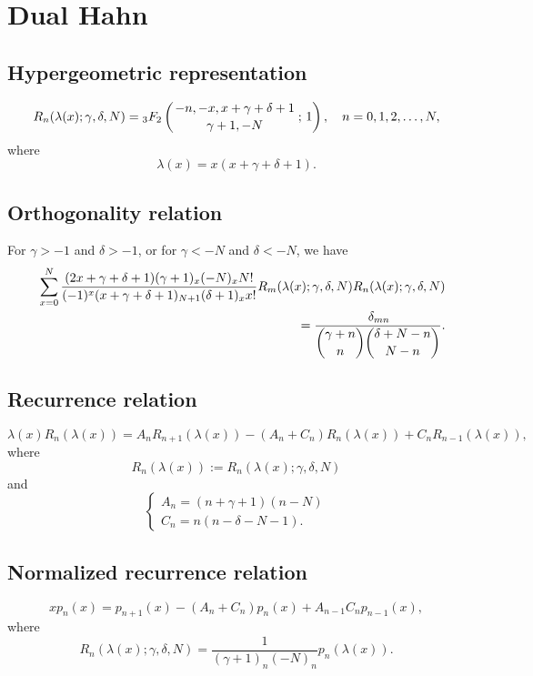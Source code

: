 \documentclass[envcountchap,graybox]{svmono}
\newcommand{\hyp}[5]{\mbox{}_{#1}{F}_{#2}
\left(\genfrac{}{}{0pt}{}{#3}{#4}\,;\,#5\right)}
\newcommand{\hyp}[5]{\,\mbox{}_{#1}F_{#2}\!\left(
  \genfrac{}{}{0pt}{}{#3}{#4};#5\right)}
\begin{document}
\section{Dual Hahn}

\par\setcounter{equation}{0}

\subsection*{Hypergeometric representation}
\begin{equation}
\label{DefDualHahn}
R_n(\lambda(x);\gamma,\delta,N)=
\hyp{3}{2}{-n,-x,x+\gamma+\delta+1}{\gamma+1,-N}{1},\quad n=0,1,2,\ldots,N,
\end{equation}
where
$$\lambda(x)=x(x+\gamma+\delta+1).$$

\subsection*{Orthogonality relation}
For $\gamma>-1$ and $\delta>-1$, or for $\gamma<-N$ and $\delta<-N$, we have
\begin{eqnarray}
\label{OrtDualHahn}
& &\sum_{x=0}^N\frac{(2x+\gamma+\delta+1)(\gamma+1)_x(-N)_xN!}{(-1)^x(x+\gamma+\delta+1)_{N+1}(\delta+1)_xx!}
R_m(\lambda(x);\gamma,\delta,N)R_n(\lambda(x);\gamma,\delta,N)\nonumber\\
& &{}=\frac{\,\delta_{mn}}{\dbinom{\gamma+n}{n}\dbinom{\delta+N-n}{N-n}}.
\end{eqnarray}

\subsection*{Recurrence relation}
\begin{equation}
\label{RecDualHahn}
\lambda(x)R_n(\lambda(x))
=A_nR_{n+1}(\lambda(x))-\left(A_n+C_n\right)R_n(\lambda(x))+C_nR_{n-1}(\lambda(x)),
\end{equation}
where
$$R_n(\lambda(x)):=R_n(\lambda(x);\gamma,\delta,N)$$
and
$$\left\{\begin{array}{l}
\displaystyle A_n=(n+\gamma+1)(n-N)\\[5mm]
\displaystyle C_n=n(n-\delta-N-1).
\end{array}\right.$$

\subsection*{Normalized recurrence relation}
\begin{equation}
\label{NormRecDualHahn}
xp_n(x)=p_{n+1}(x)-(A_n+C_n)p_n(x)+A_{n-1}C_np_{n-1}(x),
\end{equation}
where
$$R_n(\lambda(x);\gamma,\delta,N)=\frac{1}{(\gamma+1)_n(-N)_n}p_n(\lambda(x)).$$
\end{document}
